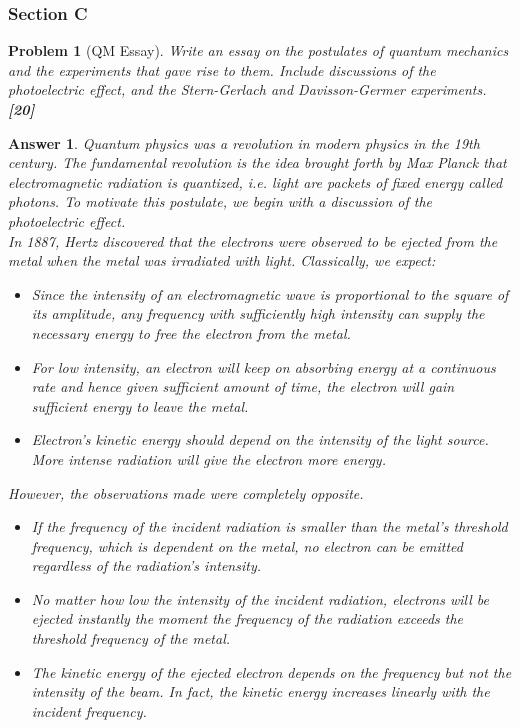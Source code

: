 \documentclass[a4paper]{article}
\newtheorem{ans}{Answer}[subsection]
\theoremstyle{new}
\newtheorem{qns}{Problem}[subsection]
\begin{document}
\subsubsection{Section C}
\begin{qns}[QM Essay]
Write an essay on the postulates of quantum mechanics and the experiments that gave rise to them. Include discussions of the photoelectric effect, and the Stern-Gerlach and Davisson-Germer experiments. \hfill\textbf{[20]}
\end{qns}
\begin{ans}
Quantum physics was a revolution in modern physics in the 19th century. The fundamental revolution is the idea brought forth by Max Planck that electromagnetic radiation is quantized, i.e. light are packets of fixed energy called photons. To motivate this postulate, we begin with a discussion of the photoelectric effect.\\[5pt]
In 1887, Hertz discovered that the electrons were observed to be ejected from the metal when the metal was irradiated with light. Classically, we expect:
\begin{itemize}
\item Since the intensity of an electromagnetic wave is proportional to the square of its amplitude, any frequency with sufficiently high intensity can supply the necessary energy to free the electron from the metal.
\item For low intensity, an electron will keep on absorbing energy at a continuous rate and hence given sufficient amount of time, the electron will gain sufficient energy to leave the metal.
\item Electron's kinetic energy should depend on the intensity of the light source. More intense radiation will give the electron more energy.
\end{itemize}
However, the observations made were completely opposite.
\begin{itemize}
\item If the frequency of the incident radiation is smaller than the metal's threshold frequency, which is dependent on the metal, no electron can be emitted regardless of the radiation's intensity.
\item No matter how low the intensity of the incident radiation, electrons will be ejected instantly the moment the frequency of the radiation exceeds the threshold frequency of the metal.
\item The kinetic energy of the ejected electron depends on the frequency but not the intensity of the beam. In fact, the kinetic energy increases linearly with the incident frequency.

\end{itemize}
\end{ans}
\end{document}
